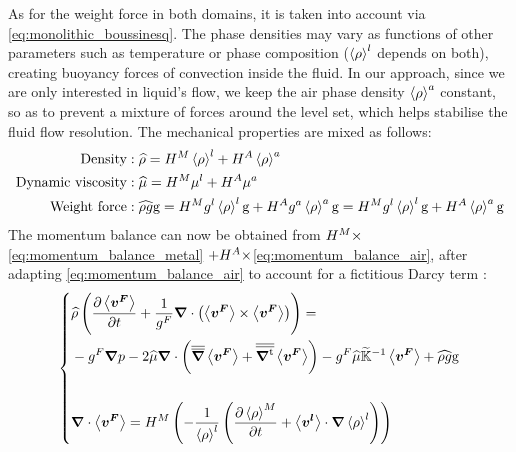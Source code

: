 As for the weight force in both domains, it is taken into account via \cref{eq:monolithic_boussinesq}. 
The phase densities may vary as functions of other parameters such
as temperature or phase composition ($\left \langle \rho \right \rangle^l$ depends on both), creating buoyancy forces of convection inside the fluid.
In our approach, since we are only interested in liquid's flow, we keep the air phase density $\left \langle \rho \right \rangle^a$ constant,
so as to prevent a mixture of forces around the level set, which helps stabilise the fluid flow resolution.
The mechanical properties are mixed as follows:
\begin{align}
%
\label{eq:monolithic_density}
\text{Density}&: \mix{\rho} = \heavisideM \rhol + \heavisideA \rhoa \\
%
\label{eq:monolithic_viscosity}
\text{Dynamic viscosity}&: \mix{\mu} = \heavisideM \mul + \heavisideA \mua \\
%
\label{eq:monolithic_boussinesq}
\text{Weight force}&: \mix{\rho g} \gravity 	=  \heavisideM \gl \rhol \gravity + \heavisideA \ga \rhoa \gravity
												=  \heavisideM \gl \rhol \gravity + \heavisideA \rhoa \gravity
%
\end{align}
The momentum balance can now be obtained from $H^M \times$\cref{eq:momentum_balance_metal} $+H^A \times$\cref{eq:momentum_balance_air},
after adapting \cref{eq:momentum_balance_air} to account for a fictitious Darcy term :
\begin{equation}
\label{eq:monolithic_momentum}
   \left\{
   \begin{aligned}
      & \widehat{\rho} \left( \frac{\partial  \left \langle \boldsymbol{v^F} \right \rangle }{\partial t}  + \frac{1}{{g^F}} \boldsymbol{\nabla} \cdot \left( \left \langle \boldsymbol{v^F} \right \rangle \times \left \langle \boldsymbol{v^F} \right \rangle \right) \right) = \\
	  &- {g^F}\boldsymbol{\nabla} p - 2 \widehat{\mu} \boldsymbol{\nabla} \cdot \left( {\overline{\overline{\boldsymbol{\nabla}}}} \left \langle \boldsymbol{v^F} \right \rangle+ {\overline{\overline{\boldsymbol{\nabla^\text{t}}}}} \left \langle \boldsymbol{v^F} \right \rangle \right)
	  - {g^F} \widehat{\mu} \widetilde{\mathbb{K}}^{-1} \left \langle \boldsymbol{v^F} \right \rangle + \widehat{\rho g} \boldsymbol{\text{g}}\\ \\
      & \boldsymbol{\nabla} \cdot \left \langle \boldsymbol{v^F} \right \rangle = H^M \left( -\frac{1}{\left \langle \rho \right \rangle^l} \left( \frac{\partial \left \langle \rho \right \rangle^M }{\partial t} + \left \langle \boldsymbol{v^l} \right \rangle \cdot  \boldsymbol{\nabla} \left \langle \rho \right \rangle^l \right) \right)
    \end{aligned}
    \right.
\end{equation}

